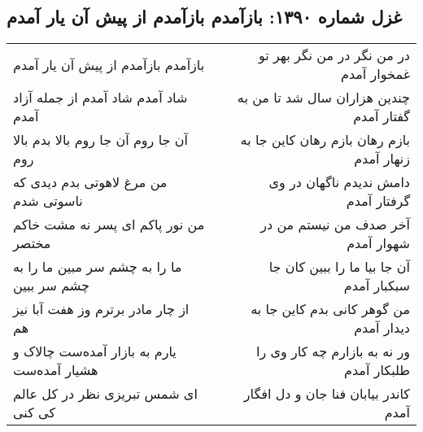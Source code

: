 \begin{center}
\section*{غزل شماره ۱۳۹۰: بازآمدم بازآمدم از پیش آن یار آمدم}
\label{sec:1390}
\begin{longtable}{l p{0.5cm} r}
بازآمدم بازآمدم از پیش آن یار آمدم
&&
در من نگر در من نگر بهر تو غمخوار آمدم
\\
شاد آمدم شاد آمدم از جمله آزاد آمدم
&&
چندین هزاران سال شد تا من به گفتار آمدم
\\
آن جا روم آن جا روم بالا بدم بالا روم
&&
بازم رهان بازم رهان کاین جا به زنهار آمدم
\\
من مرغ لاهوتی بدم دیدی که ناسوتی شدم
&&
دامش ندیدم ناگهان در وی گرفتار آمدم
\\
من نور پاکم ای پسر نه مشت خاکم مختصر
&&
آخر صدف من نیستم من در شهوار آمدم
\\
ما را به چشم سر مبین ما را به چشم سر ببین
&&
آن جا بیا ما را ببین کان جا سبکبار آمدم
\\
از چار مادر برترم وز هفت آبا نیز هم
&&
من گوهر کانی بدم کاین جا به دیدار آمدم
\\
یارم به بازار آمده‌ست چالاک و هشیار آمده‌ست
&&
ور نه به بازارم چه کار وی را طلبکار آمدم
\\
ای شمس تبریزی نظر در کل عالم کی کنی
&&
کاندر بیابان فنا جان و دل افگار آمدم
\\
\end{longtable}
\end{center}
